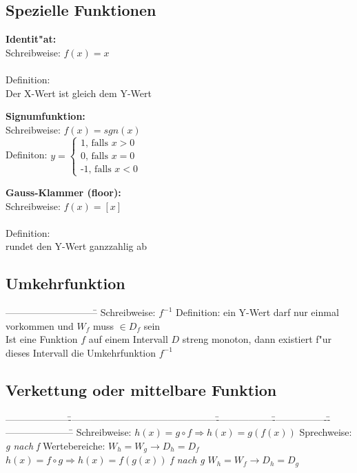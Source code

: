 \begin{flushleft}
		\subsection{Spezielle Funktionen}
			\begin{minipage}[t]{6cm}
				\textbf{Identit"at:}\\
				Schreibweise: $f(x)=x$\\\\
				Definition:\\
				Der X-Wert ist gleich dem Y-Wert
			\end{minipage}
			\hfill
			\begin{minipage}[t]{6cm}
				\textbf{Signumfunktion:}\\
				Schreibweise: $f(x)=sgn(x)$\\
				Definiton: $y=\left\{\begin{array}{l}\text{1, falls $x>0$}\\
				\text{0, falls $x=0$}\\\text{-1, falls $x<0$}\end{array}\right.$
			\end{minipage}	
			\hfill
			\begin{minipage}[t]{6cm}
				\textbf{Gauss-Klammer (floor):}\\
				Schreibweise: $f(x)=\left[x\right]$\\\\
				Definition:\\
				rundet den Y-Wert ganzzahlig ab
			\end{minipage}
				
		\subsection{Umkehrfunktion}
		\begin{tabbing}
			-----------------------------\= \kill
			Schreibweise: $f^{-1}$ \> Definition: ein Y-Wert darf nur einmal vorkommen und $W_f$ muss $\in D_f$ sein\\
			Ist eine Funktion $f$ auf einem Intervall $D$ streng monoton, dann existiert f"ur dieses Intervall die Umkehrfunktion $f^{-1}$
		\end{tabbing}
		
		\subsection{Verkettung oder mittelbare Funktion}
		\begin{tabbing}
			--------------------\=----------------------------------------------\=------------------\=-----------------\=----------------------\= \kill	
			Schreibweise: \> $h(x)=g \circ f \Rightarrow h(x)=g(f(x))$ \> Sprechweise: \> \textit{g nach f} \> Wertebereiche: \> $W_h=W_g \rightarrow D_h=D_f$\\
								    \> $h(x)=f \circ g \Rightarrow h(x)=f(g(x))$ \>  \> \textit{f nach g} \> \> $W_h=W_f \rightarrow D_h=D_g$
		\end{tabbing}
		

\end{flushleft}
